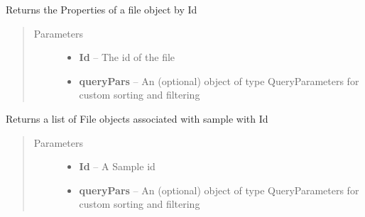 \documentclass[letterpaper,10pt,english]{sphinxmanual}
\begin{document}
\begin{fulllineitems}
\begin{fulllineitems}
\end{fulllineitems}


\begin{fulllineitems}
\label{Available modules:BaseSpacePy.api.BaseSpaceAPI.BaseSpaceAPI.getFilePropertiesById}
Returns the Properties of a file object by Id
\begin{quote}\begin{description}
\item[{Parameters}] \leavevmode\begin{itemize}
\item {} 
\textbf{Id} -- The id of the file

\item {} 
\textbf{queryPars} -- An (optional) object of type QueryParameters for custom sorting and filtering

\end{itemize}

\end{description}\end{quote}

\end{fulllineitems}


\begin{fulllineitems}
\label{Available modules:BaseSpacePy.api.BaseSpaceAPI.BaseSpaceAPI.getFilesBySample}
Returns a list of File objects associated with sample with Id
\begin{quote}\begin{description}
\item[{Parameters}] \leavevmode\begin{itemize}
\item {} 
\textbf{Id} -- A Sample id

\item {} 
\textbf{queryPars} -- An (optional) object of type QueryParameters for custom sorting and filtering

\end{itemize}

\end{description}\end{quote}


\end{fulllineitems}
\end{fulllineitems}
\end{document}
